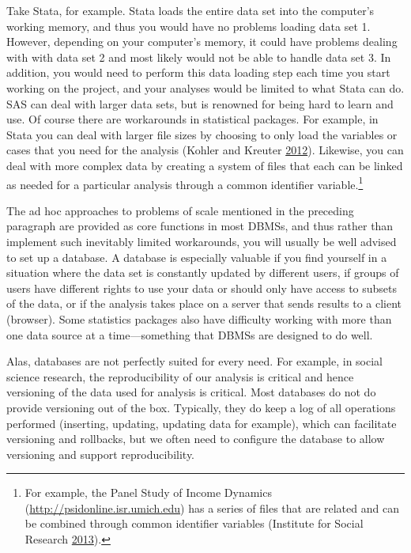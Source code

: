 \documentclass[]{krantz}
\begin{document}
Take Stata, for example. Stata loads the entire data set into the
computer's working memory, and thus you would have no problems loading
data set 1. However, depending on your computer's memory, it could have
problems dealing with with data set 2 and most likely would not be able
to handle data set 3. In addition, you would need to perform this data
loading step each time you start working on the project, and your
analyses would be limited to what Stata can do. SAS can deal with larger
data sets, but is renowned for being hard to learn and use. Of course
there are workarounds in statistical packages. For example, in Stata you
can deal with larger file sizes by choosing to only load the variables
or cases that you need for the analysis (Kohler and Kreuter
\protect\hyperlink{ref-kohler2012datenanalyse}{2012}). Likewise, you can
deal with more complex data by creating a system of files that each can
be linked as needed for a particular analysis through a common
identifier variable.\footnote{For example, the Panel Study of Income
  Dynamics (\url{http://psidonline.isr.umich.edu}) has a series of files
  that are related and can be combined through common identifier
  variables (Institute for Social Research
  \protect\hyperlink{ref-PSIDguide}{2013}).}

The ad hoc approaches to problems of scale mentioned in the preceding
paragraph are provided as core functions in most DBMSs, and thus rather
than implement such inevitably limited workarounds, you will usually be
well advised to set up a database. A database is especially valuable if
you find yourself in a situation where the data set is constantly
updated by different users, if groups of users have different rights to
use your data or should only have access to subsets of the data, or if
the analysis takes place on a server that sends results to a client
(browser). Some statistics packages also have difficulty working with
more than one data source at a time---something that DBMSs are designed
to do well.

Alas, databases are not perfectly suited for every need. For example, in
social science research, the reproducibility of our analysis is critical
and hence versioning of the data used for analysis is critical. Most
databases do not do provide versioning out of the box. Typically, they
do keep a log of all operations performed (inserting, updating, updating
data for example), which can facilitate versioning and rollbacks, but we
often need to configure the database to allow versioning and support
reproducibility.
\end{document}
